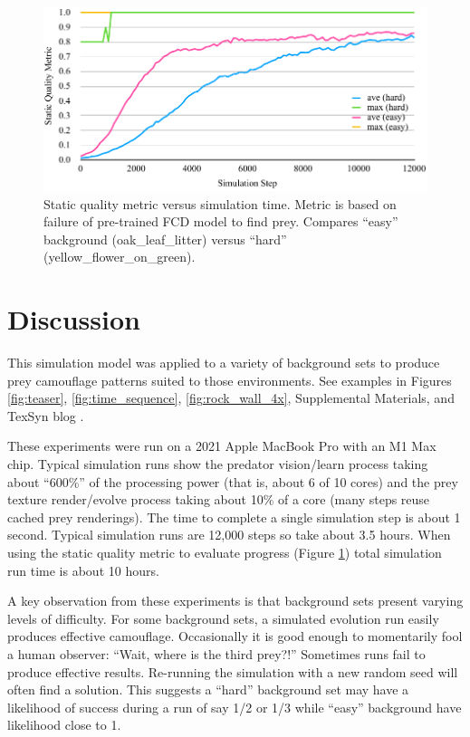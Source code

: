 \documentclass[letterpaper]{article}
\begin{document}

\begin{figure}
    \includegraphics[width=\columnwidth]{SQM_plot_easy_vs_hard.pdf}
    \caption{Static quality metric versus simulation time. Metric is based on failure of pre-trained FCD model to find prey. Compares “easy” background (oak\_leaf\_litter) versus “hard” (yellow\_flower\_on\_green).}
    \label{fig:sqm_plot}
\end{figure}


\section{Discussion}
\label{sec:discussion}
This simulation model was applied to a variety of background sets to produce prey camouflage patterns suited to those environments. See examples in Figures \ref{fig:teaser}, \ref{fig:time_sequence}, \ref{fig:rock_wall_4x}, Supplemental Materials, and TexSyn blog \cite{reynolds_texsyn_blog_2023}.
\par
These experiments were run on a 2021 Apple MacBook Pro with an M1 Max chip. Typical simulation runs show the predator vision/learn process taking about “600\%” of the processing power (that is, about 6 of 10 cores) and the prey texture render/evolve process taking about 10\% of a core (many steps reuse cached prey renderings). The time to complete a single simulation step is about 1 second. Typical simulation runs are 12,000 steps so take about 3.5 hours. When using the static quality metric to evaluate progress (Figure \ref{fig:sqm_plot}) total simulation run time is about 10 hours.
\par
A key observation from these experiments is that background sets present varying levels of difficulty. For some background sets, a simulated evolution run easily produces effective camouflage. Occasionally it is good enough to momentarily fool a human observer: “Wait, where is the third prey?!” Sometimes runs fail to produce effective results. Re-running the simulation with a new random seed will often find a solution. This suggests a “hard” background set may have a likelihood of success during a run of say 1/2 or 1/3 while “easy” background have likelihood close to 1.
\par
\end{document}
